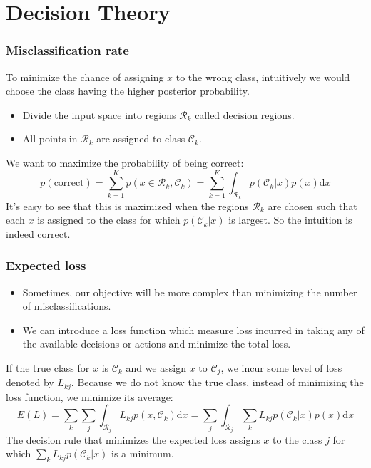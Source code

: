 \documentclass{beamer}
\begin{document}
\section{Decision Theory}

\begin{frame}
    \frametitle{Misclassification rate}
    To minimize the chance of assigning $x$ to the wrong class, intuitively we would choose the class having the higher posterior probability.
    \begin{itemize}
        \item Divide the input space into regions $\mathcal{R}_{k}$ called decision regions.
        \item All points in $\mathcal{R}_{k}$ are assigned to class $\mathcal{C}_{k}$.
    \end{itemize}
    We want to maximize the probability of being correct:
    \begin{equation*}
        p(\textrm{correct})=\sum_{k=1}^{K}p(x\in\mathcal{R}_{k},\mathcal{C}_{k})=\sum_{k=1}^{K}\int_{\mathcal{R}_{k}}p(\mathcal{C}_{k}|x)p(x)\mathrm{d}x
    \end{equation*}
    It's easy to see that this is maximized when the regions $\mathcal{R}_{k}$ are chosen such that each $x$ is assigned to the class for which $p(\mathcal{C}_{k}|x)$ is largest. So the intuition is indeed correct.
\end{frame}

\begin{frame}
    \frametitle{Expected loss}
    \begin{itemize}
        \item Sometimes, our objective will be more complex than minimizing the number of misclassifications.
        \item We can introduce a loss function which measure loss incurred in taking any of the available decisions or actions and minimize the total loss.
    \end{itemize}
    If the true class for $x$ is $\mathcal{C}_{k}$ and we assign $x$ to $\mathcal{C}_{j}$, we incur some level of loss denoted by $L_{kj}$. Because we do not know the true class, instead of minimizing the loss function, we minimize its average:
    \begin{equation*}
        E(L)=\sum_{k}\sum_{j}\int_{\mathcal{R}_{j}}L_{kj}p(x,\mathcal{C}_{k})\mathrm{d}x=\sum_{j}\int_{\mathcal{R}_{j}}\sum_{k}L_{kj}p(\mathcal{C}_{k}|x)p(x)\mathrm{d}x
    \end{equation*}
    The decision rule that minimizes the expected loss assigns $x$ to the class $j$ for which $\sum_{k}L_{kj}p(\mathcal{C}_{k}|x)$ is a minimum.
\end{frame}
\end{document}
